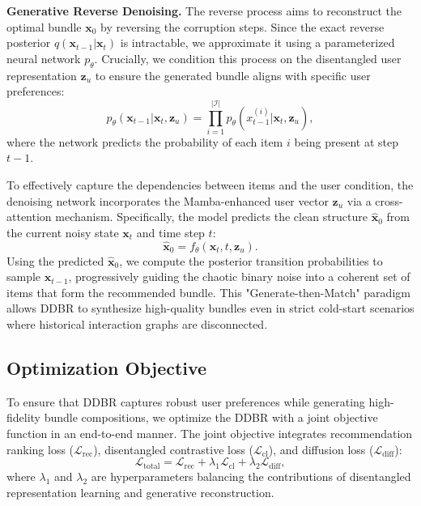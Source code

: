 \documentclass[lettersize,journal]{IEEEtran}
\begin{document}
\noindent\textbf{Generative Reverse Denoising.}
The reverse process aims to reconstruct the optimal bundle $\mathbf{x}_0$ by reversing the corruption steps. Since the exact reverse posterior $q(\mathbf{x}_{t-1} | \mathbf{x}_t)$ is intractable, we approximate it using a parameterized neural network $p_\theta$. Crucially, we condition this process on the disentangled user representation $\mathbf{z}_u$ to ensure the generated bundle aligns with specific user preferences:
\begin{equation}
    p_\theta(\mathbf{x}_{t-1} | \mathbf{x}_t, \mathbf{z}_u) = \prod_{i=1}^{|\mathcal{I}|} p_\theta(x_{t-1}^{(i)} | \mathbf{x}_t, \mathbf{z}_u),
\end{equation}
where the network predicts the probability of each item $i$ being present at step $t-1$.

To effectively capture the dependencies between items and the user condition, the denoising network incorporates the Mamba-enhanced user vector $\mathbf{z}_u$ via a cross-attention mechanism. Specifically, the model predicts the clean structure $\hat{\mathbf{x}}_0$ from the current noisy state $\mathbf{x}_t$ and time step $t$:
\begin{equation}
    \hat{\mathbf{x}}_0 = f_\theta(\mathbf{x}_t, t, \mathbf{z}_u).
\end{equation}
Using the predicted $\hat{\mathbf{x}}_0$, we compute the posterior transition probabilities to sample $\mathbf{x}_{t-1}$, progressively guiding the chaotic binary noise into a coherent set of items that form the recommended bundle. This "Generate-then-Match" paradigm allows DDBR to synthesize high-quality bundles even in strict cold-start scenarios where historical interaction graphs are disconnected.

\subsection{Optimization Objective}
To ensure that DDBR captures robust user preferences while generating high-fidelity bundle compositions, we optimize the DDBR with a joint objective function in an end-to-end manner. The joint objective integrates recommendation ranking loss ($\mathcal{L}_{\mathrm{rec}}$), disentangled contrastive loss ($\mathcal{L}_{\mathrm{cl}}$), and diffusion loss ($\mathcal{L}_{\mathrm{diff}}$):
\begin{equation}
    \mathcal{L}_{\mathrm{total}} = \mathcal{L}_{\mathrm{rec}} + \lambda_1 \mathcal{L}_{\mathrm{cl}} + \lambda_2 \mathcal{L}_{\mathrm{diff}},
    \label{eq:total_loss}
\end{equation}
where $\lambda_1$ and $\lambda_2$ are hyperparameters balancing the contributions of disentangled representation learning and generative reconstruction.
\end{document}
